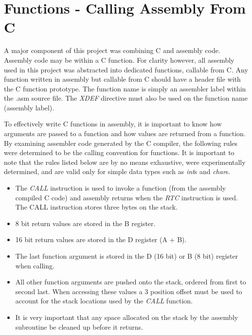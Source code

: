 \section{Functions - Calling Assembly From C}

A major component of this project was combining C and assembly code.
Assembly code may be  within a C function.
For clarity however, all assembly used in this project was abstracted into dedicated functions, callable from C.
Any function written in assembly but callable from C should have a header file with the C function prototype. 
The function name is simply an assembler label within the .asm source file.
The \emph{XDEF} directive must also be used on the function name (assembly label).

To effectively write C functions in assembly, it is important to know how arguments are passed to a function and how values are returned from a function.
By examining assembler code generated by the C compiler, the following rules were determined to be the calling convention for functions.
It is important to note that the rules listed below are by no means exhaustive, were experimentally determined, and are valid only for simple data types such as \emph{int}s and \emph{char}s.

\begin{itemize}
\item The \emph{CALL} instruction is used to invoke a function (from the assembly compiled C code) and assembly returns when the \emph{RTC} instruction is used. The CALL instruction stores three bytes on the stack.
\item 8 bit return values are stored in the B register.
\item 16 bit return values are stored in the D register (A + B).
\item The last function argument is stored in the D (16 bit) or B (8 bit) register when calling.
\item All other function arguments are pushed onto the stack, ordered from first to second last. When accessing these values a 3 position offset must be used to account for the stack locations used by the \emph{CALL} function.
\item It is very important that any space allocated on the stack by the assembly subroutine be cleaned up before it returns.
\end{itemize}
